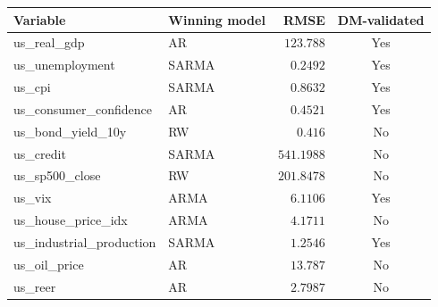 \begin{tabular}{llrc}
  \toprule
  Variable & Winning model & RMSE & DM-validated \\
  \midrule
  us\_real\_gdp & AR & $123.788$ & Yes \\
  us\_unemployment & SARMA & $0.2492$ & Yes \\
  us\_cpi & SARMA & $0.8632$ & Yes \\
  us\_consumer\_confidence & AR & $0.4521$ & Yes \\
  us\_bond\_yield\_10y & RW & $0.416$ & No \\
  us\_credit & SARMA & $541.1988$ & No \\
  us\_sp500\_close & RW & $201.8478$ & No \\
  us\_vix & ARMA & $6.1106$ & Yes \\
  us\_house\_price\_idx & ARMA & $4.1711$ & No \\
  us\_industrial\_production & SARMA & $1.2546$ & Yes \\
  us\_oil\_price & AR & $13.787$ & No \\
  us\_reer & AR & $2.7987$ & No \\
  \bottomrule
\end{tabular}